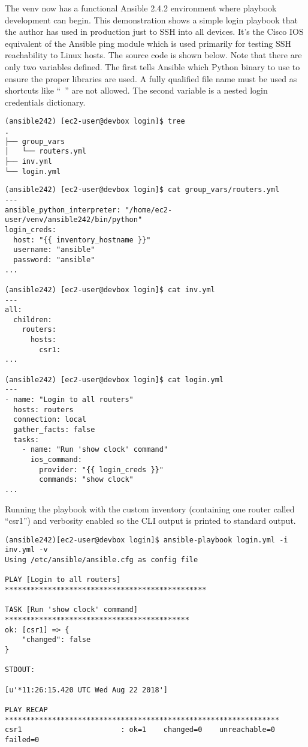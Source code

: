 The venv now has a functional Ansible 2.4.2 environment where playbook
development can begin. This demonstration shows a simple login playbook that
the author has used in production just to SSH into all devices. It's the Cisco
IOS equivalent of the Ansible ping module which is used primarily for testing
SSH reachability to Linux hosts. The source code is shown below. Note that
there are only two variables defined. The first tells Ansible which Python
binary to use to ensure the proper libraries are used. A fully qualified file
name must be used as shortcuts like ``~'' are not allowed. The second variable
is a nested login credentials dictionary.

\begin{verbatim}
(ansible242) [ec2-user@devbox login]$ tree
.
├── group_vars
│   └── routers.yml
├── inv.yml
└── login.yml
\end{verbatim}

\begin{verbatim}
(ansible242) [ec2-user@devbox login]$ cat group_vars/routers.yml
---
ansible_python_interpreter: "/home/ec2-user/venv/ansible242/bin/python"
login_creds:
  host: "{{ inventory_hostname }}"
  username: "ansible"
  password: "ansible"
...

(ansible242) [ec2-user@devbox login]$ cat inv.yml
---
all:
  children:
    routers:
      hosts:
        csr1:
...

(ansible242) [ec2-user@devbox login]$ cat login.yml
---
- name: "Login to all routers"
  hosts: routers
  connection: local
  gather_facts: false
  tasks:
    - name: "Run 'show clock' command"
      ios_command:
        provider: "{{ login_creds }}"
        commands: "show clock"
...
\end{verbatim}

Running the playbook with the custom inventory (containing one router called
``csr1'') and verbosity enabled so the CLI output is printed to standard
output.

\begin{verbatim}
(ansible242)[ec2-user@devbox login]$ ansible-playbook login.yml -i inv.yml -v
Using /etc/ansible/ansible.cfg as config file

PLAY [Login to all routers] ***********************************************

TASK [Run 'show clock' command] *******************************************
ok: [csr1] => {
    "changed": false
}

STDOUT:

[u'*11:26:15.420 UTC Wed Aug 22 2018']

PLAY RECAP ****************************************************************
csr1                       : ok=1    changed=0    unreachable=0    failed=0
\end{verbatim}

